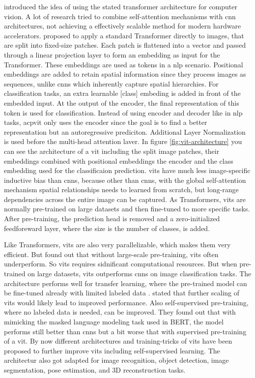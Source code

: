 \documentclass[conference]{IEEEtran}
\begin{document}
  \citeauthor{visiontransformers2021} introduced the idea of using the stated transformer architecture for computer vision. A lot of research tried to combine self-attention mechanisms with \ac{cnn} architectures, not achieving a effectively scalable method for modern hardware accelerators. \cite{visiontransformers2021} proposed to apply a standard Transformer directly to images, that are split into fixed-size patches. Each patch is flattened into a vector and passed through a linear projection layer to form an embedding as input for the Transformer. These embeddings are used as tokens in a \ac{nlp} scenario. Positional embeddings are added to retain spatial information since they process images as sequences, unlike \acp{cnn} which inherently capture spatial hierarchies. For classification tasks, an extra learnable [class] embeding is added in front of the embedded input. At the output of the encoder, the final representation of this token is used for classification. Instead of using encoder and decoder like in \ac{nlp} tasks, acp{vit} only uses the encoder since the goal is to find a better representation but an autoregressive prediciton. Additional Layer Normalization is used before the multi-head attention laver. \cite{vit-state-challenges} In figure \ref{fig:vit-architecture} you can see the architecture of a \ac{vit} including the split image patches, their embeddings combined with positional embeddings the encoder and the class embedding used for the classificaion prediction.
  \acp{vit} have much less image-specific inductive bias than \acp{cnn}, because other than \acp{cnn}, with the global self-attention mechanism spatial relationships needs to learned from scratch, but long-range dependencies across the entire image can be captured. As Transformers, \acp{vit} are normally pre-trained on large datasets and then fine-tuned to more specific tasks. After pre-training, the prediction head is removed and a zero-initialized feedforeward layer, where the size is the number of classes, is added.

  Like Transformers, \acp{vit} are also very parallelizable, which makes them very efficient. But \cite{visiontransformers2021} found out that without large-scale pre-training, \acp{vit} often underperform. So \acp{vit} requires sidnificant computational resources. But when pre-trained on large datasets, \acp{vit} outperforms \acp{cnn} on image classification tasks. The architecture performs well for transfer learning, where the pre-trained model can be fine-tuned already with limited labeled data \cite{visiontransformers2021}.  \cite{visiontransformers2021} stated that further scaling of \acp{vit} would likely lead to improved performance. Also self-supervised pre-training, where no labeled data is needed, can be improved. They found out that with mimicking the masked language modeling task used in BERT, the model performs still better than \acp{cnn} but a bit worse that with supervised pre-training of a \ac{vit}. By now different architectures and training-tricks of \acp{vit} have been proposed to further improve \acp{vit} including self-supervised learning. The architectur also got adapted for image recognition, object detection, image segmentation, pose estimation, and 3D reconstruction tasks. \cite{vit-state-challenges}
\end{document}

